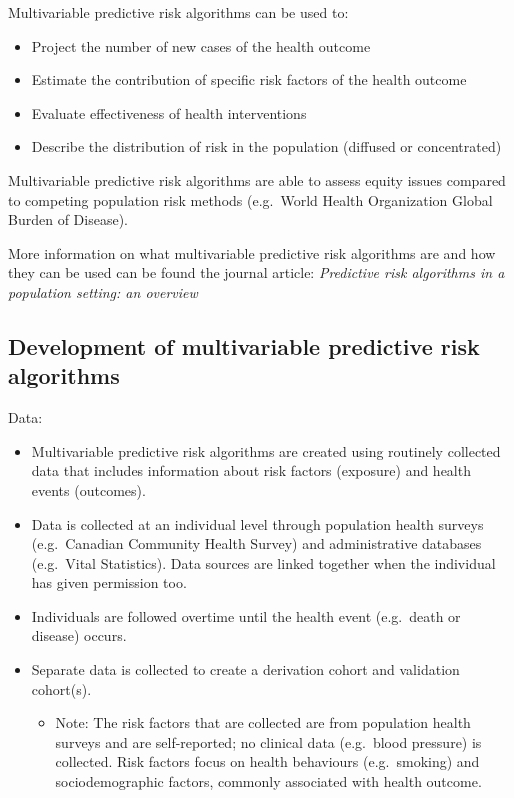 \documentclass[]{book}
\providecommand{\tightlist}{%
  \setlength{\itemsep}{0pt}\setlength{\parskip}{0pt}}
\begin{document}
Multivariable predictive risk algorithms can be used to:

\begin{itemize}
\tightlist
\item
  Project the number of new cases of the health outcome
\item
  Estimate the contribution of specific risk factors of the health
  outcome
\item
  Evaluate effectiveness of health interventions
\item
  Describe the distribution of risk in the population (diffused or
  concentrated)
\end{itemize}

Multivariable predictive risk algorithms are able to assess equity
issues compared to competing population risk methods (e.g.~World Health
Organization Global Burden of Disease).

More information on what multivariable predictive risk algorithms are
and how they can be used can be found the journal article:
\emph{Predictive risk algorithms in a population setting: an overview}
\citep{PoRTover}

\subsection{Development of multivariable predictive risk
algorithms}\label{development-of-multivariable-predictive-risk-algorithms}

Data:

\begin{itemize}
\item
  Multivariable predictive risk algorithms are created using routinely
  collected data that includes information about risk factors (exposure)
  and health events (outcomes).
\item
  Data is collected at an individual level through population health
  surveys (e.g.~Canadian Community Health Survey) and administrative
  databases (e.g.~Vital Statistics). Data sources are linked together
  when the individual has given permission too.
\item
  Individuals are followed overtime until the health event (e.g.~death
  or disease) occurs.
\item
  Separate data is collected to create a derivation cohort and
  validation cohort(s).

  \begin{itemize}
  \tightlist
  \item
    Note: The risk factors that are collected are from population health
    surveys and are self-reported; no clinical data (e.g.~blood
    pressure) is collected. Risk factors focus on health behaviours
    (e.g.~smoking) and sociodemographic factors, commonly associated
    with health outcome.
  \end{itemize}
\end{itemize}
\end{document}
